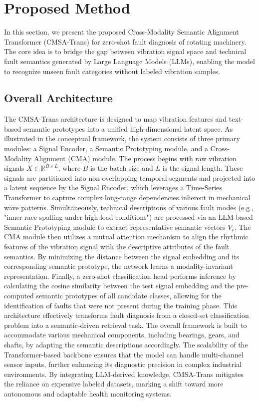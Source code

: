 \section{Proposed Method}
In this section, we present the proposed Cross-Modality Semantic Alignment Transformer (CMSA-Trans) for zero-shot fault diagnosis of rotating machinery. The core idea is to bridge the gap between vibration signal space and technical fault semantics generated by Large Language Models (LLMs), enabling the model to recognize unseen fault categories without labeled vibration samples.

\subsection{Overall Architecture}
The CMSA-Trans architecture is designed to map vibration features and text-based semantic prototypes into a unified high-dimensional latent space. As illustrated in the conceptual framework, the system consists of three primary modules: a Signal Encoder, a Semantic Prototyping module, and a Cross-Modality Alignment (CMA) module. The process begins with raw vibration signals $X \in \mathbb{R}^{B \times L}$, where $B$ is the batch size and $L$ is the signal length. These signals are partitioned into non-overlapping temporal segments and projected into a latent sequence by the Signal Encoder, which leverages a Time-Series Transformer to capture complex long-range dependencies inherent in mechanical wave patterns. Simultaneously, technical descriptions of various fault modes (e.g., "inner race spalling under high-load conditions") are processed via an LLM-based Semantic Prototyping module to extract representative semantic vectors $V_s$. The CMA module then utilizes a mutual attention mechanism to align the rhythmic features of the vibration signal with the descriptive attributes of the fault semantics. By minimizing the distance between the signal embedding and its corresponding semantic prototype, the network learns a modality-invariant representation. Finally, a zero-shot classification head performs inference by calculating the cosine similarity between the test signal embedding and the pre-computed semantic prototypes of all candidate classes, allowing for the identification of faults that were not present during the training phase. This architecture effectively transforms fault diagnosis from a closed-set classification problem into a semantic-driven retrieval task. The overall framework is built to accommodate various mechanical components, including bearings, gears, and shafts, by adapting the semantic descriptions accordingly. The scalability of the Transformer-based backbone ensures that the model can handle multi-channel sensor inputs, further enhancing its diagnostic precision in complex industrial environments. By integrating LLM-derived knowledge, CMSA-Trans mitigates the reliance on expensive labeled datasets, marking a shift toward more autonomous and adaptable health monitoring systems.

